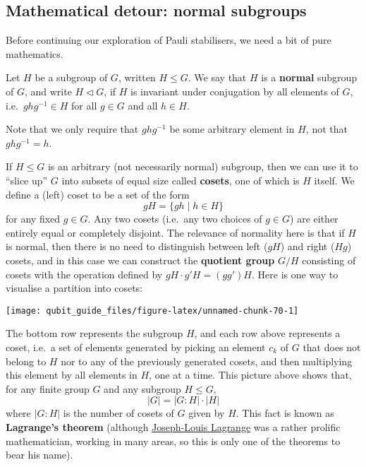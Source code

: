 \documentclass[fleqn]{article}
\begin{document}
\hypertarget{mathematical-detour-normal-subgroups}{%
\subsection{Mathematical detour: normal subgroups}\label{mathematical-detour-normal-subgroups}}

Before continuing our exploration of Pauli stabilisers, we need a bit of pure mathematics.

Let \(H\) be a subgroup of \(G\), written \(H\leqslant G\).
We say that \(H\) is a \textbf{normal} subgroup of \(G\), and write \(H\triangleleft G\), if \(H\) is invariant under conjugation by all elements of \(G\), i.e.~\(ghg^{-1}\in H\) for all \(g\in G\) and all \(h\in H\).

Note that we only require that \(ghg^{-1}\) be some arbitrary element in \(H\), not that \(ghg^{-1}=h\).

If \(H\leqslant G\) is an arbitrary (not necessarily normal) subgroup, then we can use it to ``slice up'' \(G\) into subsets of equal size called \textbf{cosets}, one of which is \(H\) itself.
We define a (left) coset to be a set of the form
\[
  gH = \{gh \mid h\in H\}
\]
for any fixed \(g\in G\).
Any two cosets (i.e.~any two choices of \(g\in G\)) are either entirely equal or completely disjoint.
The relevance of normality here is that if \(H\) is normal, then there is no need to distinguish between left (\(gH\)) and right (\(Hg\)) cosets, and in this case we can construct the \textbf{quotient group} \(G/H\) consisting of cosets with the operation defined by \(gH\cdot g'H=(gg')H\).
Here is one way to visualise a partition into cosets:

\begin{center}\texttt{[image: qubit\_guide\_files/figure-latex/unnamed-chunk-70-1]} \end{center}

The bottom row represents the subgroup \(H\), and each row above represents a coset, i.e.~a set of elements generated by picking an element \(c_k\) of \(G\) that does not belong to \(H\) nor to any of the previously generated cosets, and then multiplying this element by all elements in \(H\), one at a time.
This picture above shows that, for any finite group \(G\) and any subgroup \(H\leqslant G\),
\[
  |G| = |G:H|\cdot|H|
\]
where \(|G:H|\) is the number of cosets of \(G\) given by \(H\).
This fact is known as \textbf{Lagrange's theorem} (although \href{https://en.wikipedia.org/wiki/Joseph-Louis_Lagrange}{Joseph-Louis Lagrange} was a rather prolific mathematician, working in many areas, so this is only one of the theorems to bear his name).
\end{document}
